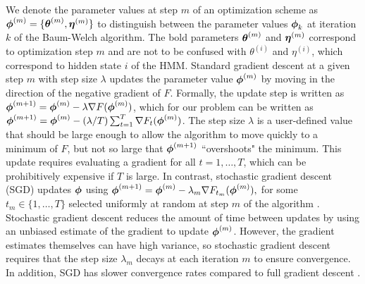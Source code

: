 We denote the parameter values at step $m$ of an optimization scheme as $\boldsymbol{\phi}^{(m)} = \{\boldsymbol{\theta}^{(m)},\boldsymbol{\eta}^{(m)}\}$ to distinguish between the parameter values $\boldsymbol{\phi}_k$ at iteration $k$ of the Baum-Welch algorithm. The bold parameters $\boldsymbol{\theta}^{(m)}$ and $\boldsymbol{\eta}^{(m)}$ correspond to optimization step $m$ and are not to be confused with $\theta^{(i)}$ and $\eta^{(i)}$, which correspond to hidden state $i$ of the HMM. Standard gradient descent at a given step $m$ with step size $\lambda$ updates the parameter value $\boldsymbol{\phi}^{(m)}$ by moving in the direction of the negative gradient of $F$. Formally, the update step is written as
%
    $\boldsymbol{\phi}^{(m+1)} = \boldsymbol{\phi}^{(m)} - \lambda \nabla F(\boldsymbol{\phi}^{(m)})$, which for our problem can be written as $\boldsymbol{\phi}^{(m+1)} = \boldsymbol{\phi}^{(m)} - (\lambda/T) \sum_{t=1}^T \nabla F_t(\boldsymbol{\phi}^{(m)})$.
%
The step size $\lambda$ is a user-defined value that should be large enough to allow the algorithm to move quickly to a minimum of $F$, but not so large that $\boldsymbol{\phi}^{(m+1)}$ ``overshoots" the minimum. This update requires evaluating a gradient for all $t = 1,\ldots,T$, which can be prohibitively expensive if $T$ is large. In contrast, stochastic gradient descent (SGD) updates $\boldsymbol{\phi}$ using
%
$\boldsymbol{\phi}^{(m+1)} = \boldsymbol{\phi}^{(m)} - \lambda_m \nabla F_{t_m}(\boldsymbol{\phi}^{(m)}),$
%
for some $t_m \in \{1,\ldots,T\}$ selected uniformly at random at step $m$ of the algorithm \citep{Robbins:1951}. Stochastic gradient descent reduces the amount of time between updates by using an unbiased estimate of the gradient to update $\boldsymbol{\phi}^{(m)}$. However, the gradient estimates themselves can have high variance, so stochastic gradient descent requires that the step size $\lambda_m$ decays at each iteration $m$ to ensure convergence. In addition, SGD has slower convergence rates compared to full gradient descent \citep{Schmidt:2017}.

